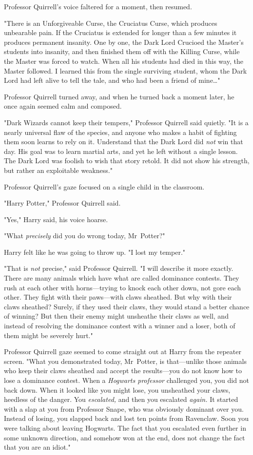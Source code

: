 Professor Quirrell's voice faltered for a moment, then resumed.

"There is an Unforgiveable Curse, the Cruciatus Curse, which produces
unbearable pain. If the Cruciatus is extended for longer than a few minutes it
produces permanent insanity. One by one, the Dark Lord Crucioed the Master's
students into insanity, and then finished them off with the Killing Curse,
while the Master was forced to watch. When all his students had died in this
way, the Master followed. I learned this from the single surviving student,
whom the Dark Lord had left alive to tell the tale, and who had been a friend
of mine{\ldots}"

Professor Quirrell turned away, and when he turned back a moment later, he once
again seemed calm and composed.

"Dark Wizards cannot keep their tempers," Professor Quirrell said quietly. "It
is a nearly universal flaw of the species, and anyone who makes a habit of
fighting them soon learns to rely on it. Understand that the Dark Lord did
\emph{not} win that day. His goal was to learn martial arts, and yet he left
without a single lesson. The Dark Lord was foolish to wish that story retold.
It did not show his strength, but rather an exploitable weakness."

Professor Quirrell's gaze focused on a single child in the classroom.

"Harry Potter," Professor Quirrell said.

"Yes," Harry said, his voice hoarse.

"What \emph{precisely} did you do wrong today, Mr~Potter?"

Harry felt like he was going to throw up. "I lost my temper."

"That is \emph{not} precise," said Professor Quirrell. "I will describe it more
exactly. There are many animals which have what are called dominance contests.
They rush at each other with horns---trying to knock each other down, not gore
each other. They fight with their paws---with claws sheathed. But why with
their claws sheathed? Surely, if they used their claws, they would stand a
better chance of winning? But then their enemy might unsheathe their claws as
well, and instead of resolving the dominance contest with a winner and a loser,
both of them might be severely hurt."

Professor Quirrell gaze seemed to come straight out at Harry from the repeater
screen. "What you demonstrated today, Mr~Potter, is that---unlike those
animals who keep their claws sheathed and accept the results---you do not know
how to lose a dominance contest. When a \emph{Hogwarts professor} challenged
you, you did not back down. When it looked like you might lose, you unsheathed
your claws, heedless of the danger. You \emph{escalated,} and then you
escalated \emph{again.} It started with a slap at you from Professor Snape, who
was obviously dominant over you. Instead of losing, you slapped back and lost
ten points from Ravenclaw. Soon you were talking about leaving Hogwarts. The
fact that you escalated even further in some unknown direction, and somehow won
at the end, does not change the fact that you are an idiot."

